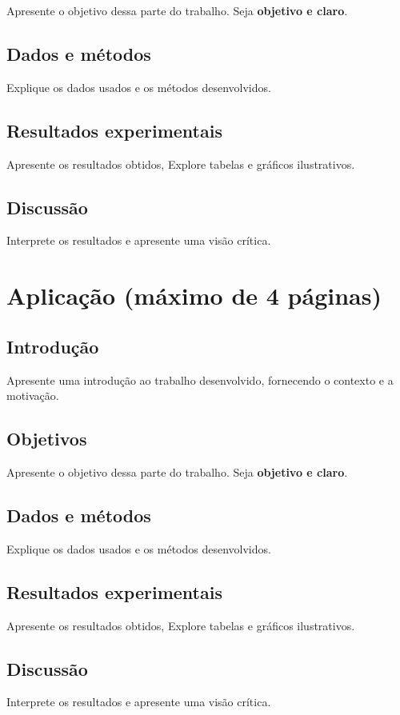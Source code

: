 \documentclass{article}
\begin{document}
Apresente o objetivo dessa parte do trabalho. Seja {\bf objetivo e claro}.

\subsection{Dados e métodos}

Explique os dados usados e os métodos desenvolvidos.

\subsection{Resultados experimentais}

Apresente os resultados obtidos, Explore tabelas e gráficos ilustrativos.

\subsection{Discussão}

Interprete os resultados e apresente uma visão crítica.

\newpage

\section{Aplicação (máximo de 4 páginas)}

\subsection{Introdução}

Apresente uma introdução ao trabalho desenvolvido, fornecendo o contexto e a motivação.

\subsection{Objetivos}

Apresente o objetivo dessa parte do trabalho. Seja {\bf objetivo e claro}.

\subsection{Dados e métodos}

Explique os dados usados e os métodos desenvolvidos.

\subsection{Resultados experimentais}

Apresente os resultados obtidos, Explore tabelas e gráficos ilustrativos.

\subsection{Discussão}

Interprete os resultados e apresente uma visão crítica.
\end{document}
